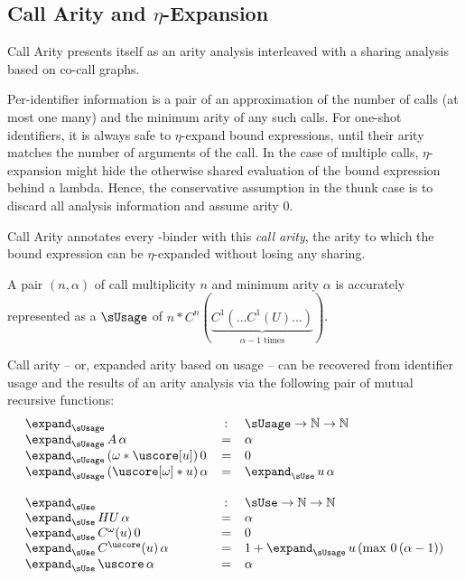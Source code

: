 \subsection{Call Arity and $\eta$-Expansion}

Call Arity \parencite{callarity} presents itself as an arity analysis interleaved with a sharing analysis based on co-call graphs. 

Per-identifier information is a pair of an approximation of the number of calls (\eg at most one \vs many) and the minimum arity of any such calls.
For one-shot identifiers, it is always safe to $\eta$-expand bound expressions, until their arity matches the number of arguments of the call.
In the case of multiple calls, $\eta$-expansion might hide the otherwise shared evaluation of the bound expression behind a lambda.
Hence, the conservative assumption in the thunk case is to discard all analysis information and assume arity 0.

Call Arity annotates every -binder with this \emph{call arity}, the arity to which the bound expression can be $\eta$-expanded without losing any sharing.

A pair $(n, \alpha)$ of call multiplicity $n$ and minimum arity $\alpha$ is accurately represented as a $\sUsage$ of $n*C^n(\underbrace{C^1(\ldots C^1(U) \ldots)}_{\alpha-1 \text{~times}})$.

Call arity -- or, expanded arity based on usage -- can be recovered from identifier usage and the results of an arity analysis via the following pair of mutual recursive functions:
\[
  \begin{array}{lcl}
    \expand_{\sUsage}                              &\,\colon& \sUsage \to \mathbb{N} \to \mathbb{N} \\
    \expand_{\sUsage}\,A\,\alpha                   &    =   & \alpha \\
    \expand_{\sUsage}\,(\omega*\uscore[u])\,0      &    =   & 0 \\
    \expand_{\sUsage}\,(\uscore[\omega]*u)\,\alpha &    =   & \expand_{\sUse}\,u\,\alpha \\
    \\
    \expand_{\sUse}                                &\,\colon& \sUse \to \mathbb{N} \to \mathbb{N} \\
    \expand_{\sUse}\,HU\,\alpha                    &    =   & \alpha \\
    \expand_{\sUse}\,C^\omega(u)\,0                &    =   & 0 \\
    \expand_{\sUse}\,C^{\uscore}(u)\,\alpha        &    =   & 1 + \expand_{\sUsage}\,u\,(\max\,0\,(\alpha - 1)) \\
    \expand_{\sUse}\,\uscore\,\alpha               &    =   & \alpha \\
  \end{array}
\]

